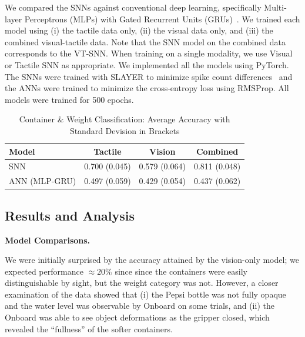 \documentclass[fyp]{socreport}
\begin{document}
We compared the SNNs against conventional deep learning, specifically
Multi-layer Perceptrons (MLPs) with Gated Recurrent Units
(GRUs)~\cite{cho2014learning}. We trained each model using (i) the tactile data
only, (ii) the visual data only, and (iii) the combined visual-tactile data.
Note that the SNN model on the combined data corresponds to the VT-SNN. When
training on a single modality, we use Visual or Tactile SNN as appropriate. We
implemented all the models using PyTorch. The SNNs were trained with SLAYER to
minimize spike count differences~\cite{NIPS2018_7415} and the ANNs were trained
to minimize the cross-entropy loss using RMSProp. All models were trained for
500 epochs.

\begin{table}
  \centering
  \caption{Container \& Weight Classification: Average Accuracy with Standard Devision in Brackets}
  \label{tbl:classacc325}
  \begin{tabular}{l|ccc}
    \hline
    \hline
    \textbf{Model} & \textbf{Tactile} & \textbf{Vision} & \textbf{Combined} \\
    \hline
    SNN  & {0.700} (0.045) & 0.579 (0.064)  & 0.811 (0.048)\\
    \hline
    ANN (MLP-GRU) & 0.497 (0.059) & 0.429 (0.054) & 0.437 (0.062)\\
    \hline
    \hline
  \end{tabular}
\end{table}

\subsection{Results and Analysis}

\noindent\textbf{Model Comparisons.}

We were initially surprised by the accuracy attained by the vision-only model;
we expected performance $\approx 20\%$ since since the containers were easily
distinguishable by sight, but the weight category was not. However, a closer
examination of the data showed that (i) the Pepsi bottle was not fully opaque
and the water level was observable by Onboard on some trials, and (ii) the
Onboard was able to see object deformations as the gripper closed, which
revealed the ``fullness'' of the softer containers.
\end{document}
